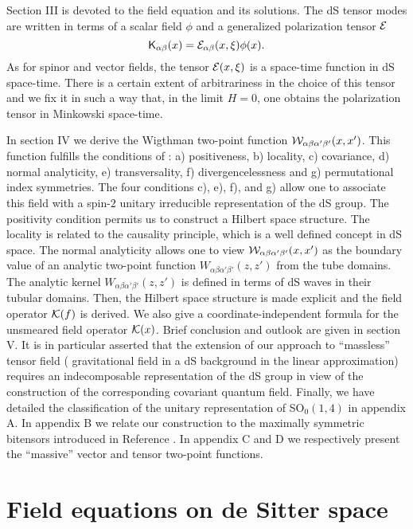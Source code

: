 \documentclass[a4paper,11pt,showpacs,preprintnumbers]{revtex4}
\def\K{\textsf{K}}
\begin{document}
Section III is devoted to the field equation and its solutions.
The dS tensor modes are written in terms of a scalar field $\phi$
and a generalized polarization tensor ${\cal E}$ $$ \K_{\alpha
\beta} (x)= {\cal E}_{\alpha \beta}(x,\xi)\phi (x). $$ As for
spinor and vector fields,  the tensor ${\cal E}(x,\xi)$ is a
space-time function in dS space-time. There is a certain extent of
arbitrariness in the choice of this tensor  and we fix it in such
a way that, in the limit $H=0$, one obtains the polarization
tensor in Minkowski space-time.

In section IV we derive the Wigthman two-point function ${\cal
W}_{\alpha\beta \alpha'\beta'}(x,x')$. This function fulfills the
conditions of : a) positiveness, b) locality, c) covariance, d)
normal analyticity, e) transversality, f) divergencelessness and
g) permutational index symmetries. The four conditions c), e), f),
and g) allow one to associate this field with a spin-$2$ unitary
irreducible representation of the dS group. The positivity
condition permits us to construct a Hilbert space structure. The
locality is related to the causality principle, which is a well
defined concept in dS space. The normal analyticity allows one to
view ${\cal W}_{\alpha\beta \alpha'\beta'}(x,x')$ as the boundary
value of an analytic two-point function $W_{\alpha\beta
\alpha'\beta'}(z,z')$ from the tube domains. The analytic kernel
$W_{\alpha\beta \alpha'\beta'}(z,z')$ is defined in terms of dS
waves in their tubular domains. Then, the Hilbert space structure
is made explicit and the field operator ${\cal K} (f)$ is derived.
We also give a coordinate-independent formula for the unsmeared
field operator ${\cal K}(x)$. Brief conclusion and outlook are
given in section V. It is in particular asserted that the
extension of our approach to ``massless'' tensor field (
gravitational field in a dS background in the linear
approximation) requires an indecomposable representation of the dS
group in view of the construction of the corresponding covariant
quantum field. Finally, we have detailed the classification of the
unitary representation of SO$_{0}(1,4)$ in appendix A. In appendix
B we relate our construction to the maximally symmetric bitensors
introduced in Reference \cite{allen}. In appendix C and D we
respectively present the ``massive'' vector and tensor two-point
functions.
\section{Field equations on de Sitter space}
\end{document}

